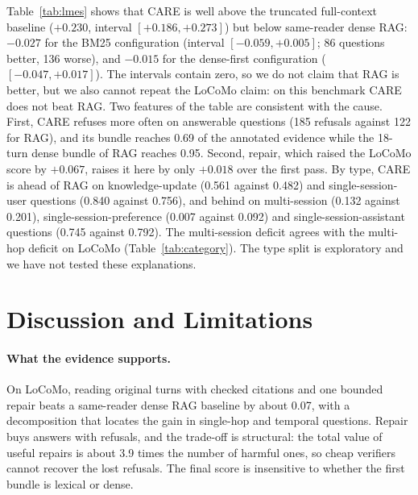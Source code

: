 \documentclass[10pt]{article}
\theoremstyle{plain}
\newcommand{\care}{\textsc{CARE}}
\begin{document}
Table~\ref{tab:lmes} shows that \care{} is well above the truncated full-context baseline ($+0.230$, interval
$[+0.186,+0.273]$) but below same-reader dense RAG: $-0.027$ for the BM25 configuration (interval $[-0.059,+0.005]$; 86
questions better, 136 worse), and $-0.015$ for the dense-first configuration ($[-0.047,+0.017]$). The intervals contain
zero, so we do not claim that RAG is better, but we also cannot repeat the LoCoMo claim: on this benchmark \care{} does
not beat RAG. Two features of the table are consistent with the cause. First, \care{} refuses more often on answerable
questions (185 refusals against 122 for RAG), and its bundle reaches 0.69 of the annotated evidence while the 18-turn
dense bundle of RAG reaches 0.95. Second, repair, which raised the LoCoMo score by $+0.067$, raises it here by only
$+0.018$ over the first pass. By type, \care{} is ahead of RAG on knowledge-update (0.561 against 0.482) and
single-session-user questions (0.840 against 0.756), and behind on multi-session (0.132 against 0.201),
single-session-preference (0.007 against 0.092) and single-session-assistant questions (0.745 against 0.792). The
multi-session deficit agrees with the multi-hop deficit on LoCoMo (Table~\ref{tab:category}). The type split is
exploratory and we have not tested these explanations.

\section{Discussion and Limitations}
\label{sec:discussion}

\paragraph{What the evidence supports.} On LoCoMo, reading original turns with checked citations and one bounded repair
beats a same-reader dense RAG baseline by about 0.07, with a decomposition that locates the gain in single-hop and
temporal questions. Repair buys answers with refusals, and the trade-off is structural: the total value of useful repairs
is about 3.9 times the number of harmful ones, so cheap verifiers cannot recover the lost refusals. The final score is
insensitive to whether the first bundle is lexical or dense.
\end{document}
